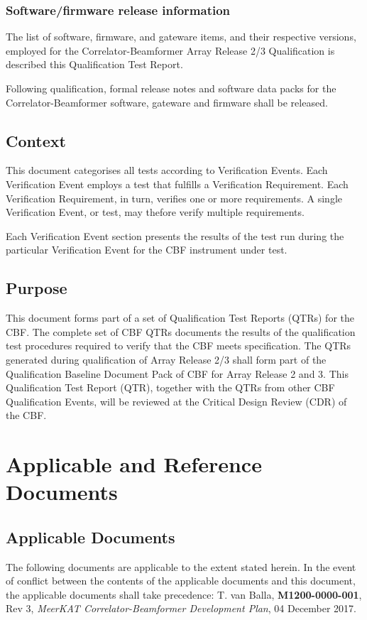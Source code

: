\subsection{Software/firmware release information}
The list of software, firmware, and gateware items, and their respective versions, employed for the Correlator-Beamformer Array Release 2/3 Qualification is described this Qualification Test Report.

Following qualification, formal release notes and software data packs for the Correlator-Beamformer software, gateware and firmware shall be released.
\section{Context}
This document categorises all tests according to Verification Events. Each Verification Event employs a test that fulfills a Verification Requirement. Each Verification Requirement, in turn, verifies one or more requirements. A single Verification Event, or test, may thefore verify multiple requirements.

Each Verification Event section presents the results of the test run during the particular Verification Event for the CBF instrument under test.
\section{Purpose}
This document forms part of a set of Qualification Test Reports (QTRs) for the CBF. The complete set of CBF QTRs documents the results of the qualification test procedures required to verify that the CBF meets specification. The QTRs generated during qualification of Array Release 2/3 shall form part of the Qualification Baseline Document Pack of CBF for Array Release 2 and 3.\newline
This Qualification Test Report (QTR), together with the QTRs from other CBF Qualification Events, will be reviewed at the Critical Design Review (CDR) of the CBF.
\chapter{Applicable and Reference Documents}
\section{Applicable Documents}
The following documents are applicable to the extent stated herein. In the event of conflict between the contents of the applicable documents and this document, the applicable documents shall take precedence:\newline\newline
[1]\hspace{10mm} T. van Balla, {\bf M1200-0000-001}, Rev 3, {\it MeerKAT Correlator-Beamformer Development Plan}, 04 December 2017\newline.
